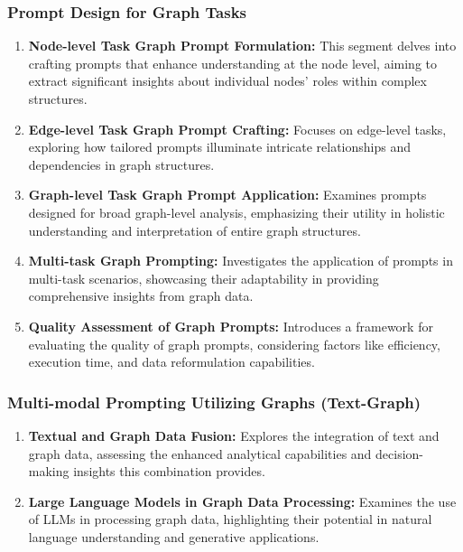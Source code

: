\subsubsection{Prompt Design for Graph Tasks}
\begin{enumerate}
    \item \textbf{Node-level Task Graph Prompt Formulation:} This segment delves into crafting prompts that enhance understanding at the node level, aiming to extract significant insights about individual nodes' roles within complex structures.
    \item \textbf{Edge-level Task Graph Prompt Crafting:} Focuses on edge-level tasks, exploring how tailored prompts illuminate intricate relationships and dependencies in graph structures.
    \item \textbf{Graph-level Task Graph Prompt Application:} Examines prompts designed for broad graph-level analysis, emphasizing their utility in holistic understanding and interpretation of entire graph structures.
    \item \textbf{Multi-task Graph Prompting:} Investigates the application of prompts in multi-task scenarios, showcasing their adaptability in providing comprehensive insights from graph data.
    \item \textbf{Quality Assessment of Graph Prompts:} Introduces a framework for evaluating the quality of graph prompts, considering factors like efficiency, execution time, and data reformulation capabilities.
\end{enumerate}

\subsubsection{Multi-modal Prompting Utilizing Graphs (Text-Graph)}
\begin{enumerate}
    \item \textbf{Textual and Graph Data Fusion:} Explores the integration of text and graph data, assessing the enhanced analytical capabilities and decision-making insights this combination provides.
    \item \textbf{Large Language Models in Graph Data Processing:} Examines the use of LLMs in processing graph data, highlighting their potential in natural language understanding and generative applications.
\end{enumerate}

